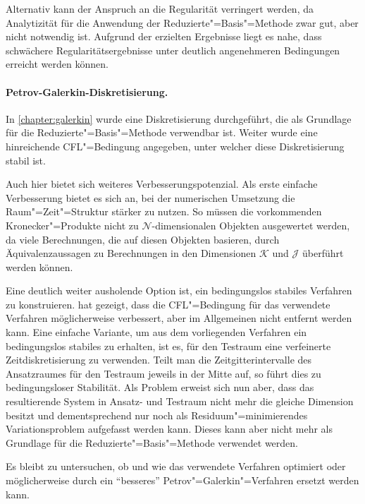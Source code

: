 \documentclass[../main.tex]{subfiles}
\begin{document}
Alternativ kann der Anspruch an die Regularität verringert werden, da Analytizität für die Anwendung der Reduzierte"=Basis"=Methode zwar gut, aber nicht notwendig ist.
Aufgrund der erzielten Ergebnisse liegt es nahe, dass schwächere Regularitätsergebnisse unter deutlich angenehmeren Bedingungen erreicht werden können.

\paragraph{Petrov-Galerkin-Diskretisierung.} %
\label{par:petrov_galerkin_diskretisierung}

In \cref{chapter:galerkin} wurde eine Diskretisierung durchgeführt, die als Grundlage für die Reduzierte"=Basis"=Methode verwendbar ist.
Weiter wurde eine hinreichende CFL"=Bedingung angegeben, unter welcher diese Diskretisierung stabil ist.

Auch hier bietet sich weiteres Verbesserungspotenzial.
Als erste einfache Verbesserung bietet es sich an, bei der numerischen Umsetzung die Raum"=Zeit"=Struktur stärker zu nutzen.
So müssen die vorkommenden Kronecker"=Produkte nicht zu $\mathcal N$-dimensionalen Objekten ausgewertet werden, da viele Berechnungen, die auf diesen Objekten basieren, durch Äquivalenzaussagen zu Berechnungen in den Dimensionen $\mathcal K$ und $\mathcal J$ überführt werden können.

Eine deutlich weiter ausholende Option ist, ein bedingungslos stabiles Verfahren zu konstruieren.
\textcite[Section 5.2]{Andreev:2012ep} hat gezeigt, dass die CFL"=Bedingung für das verwendete Verfahren möglicherweise verbessert, aber im Allgemeinen nicht entfernt werden kann.
Eine einfache Variante, um aus dem vorliegenden Verfahren ein bedingungslos stabiles zu erhalten, ist es, für den Testraum eine verfeinerte Zeitdiskretisierung zu verwenden.
Teilt man die Zeitgitterintervalle des Ansatzraumes für den Testraum jeweils in der Mitte auf, so führt dies zu bedingungsloser Stabilität.
Als Problem erweist sich nun aber, dass das resultierende System in Ansatz- und Testraum nicht mehr die gleiche Dimension besitzt und dementsprechend nur noch als Residuum"=minimierendes Variationsproblem aufgefasst werden kann.
Dieses kann aber nicht mehr als Grundlage für die Reduzierte"=Basis"=Methode verwendet werden.

Es bleibt zu untersuchen, ob und wie das verwendete Verfahren optimiert oder möglicherweise durch ein \enquote{besseres} Petrov"=Galerkin"=Verfahren ersetzt werden kann.
\end{document}
